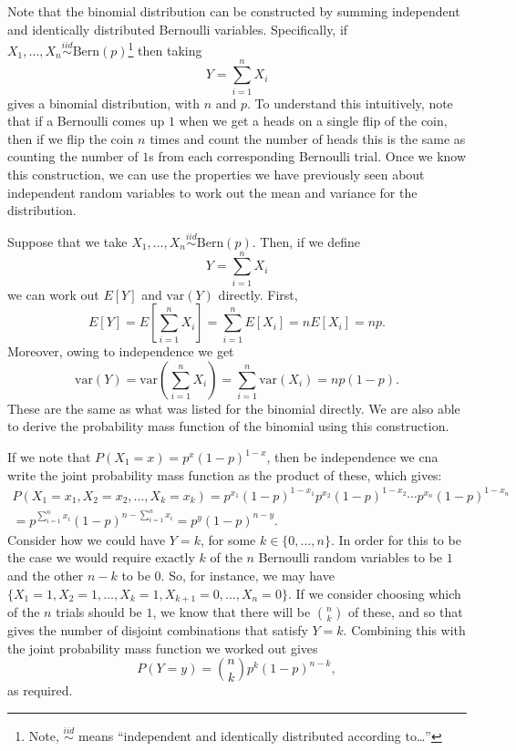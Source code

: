 \documentclass[
  letterpaper,
  DIV=11,
  numbers=noendperiod]{scrreprt}
\theoremstyle{definition}
\theoremstyle{definition}
\theoremstyle{definition}
\theoremstyle{remark}
\begin{document}
Note that the binomial distribution can be constructed by summing
independent and identically distributed Bernoulli variables.
Specifically, if
\(X_1,\dots,X_n\stackrel{iid}{\sim}\text{Bern}(p)\)\footnote{Note,
  \(\stackrel{iid}{\sim}\) means ``independent and identically
  distributed according to\ldots{}''} then taking
\[Y = \sum_{i=1}^n X_i\] gives a binomial distribution, with \(n\) and
\(p\). To understand this intuitively, note that if a Bernoulli comes up
\(1\) when we get a heads on a single flip of the coin, then if we flip
the coin \(n\) times and count the number of heads this is the same as
counting the number of \(1\)s from each corresponding Bernoulli trial.
Once we know this construction, we can use the properties we have
previously seen about independent random variables to work out the mean
and variance for the distribution.

\begin{tcolorbox}[enhanced jigsaw, coltitle=black, colframe=quarto-callout-warning-color-frame, colbacktitle=quarto-callout-warning-color!10!white, bottomrule=.15mm, opacitybacktitle=0.6, colback=white, toptitle=1mm, arc=.35mm, leftrule=.75mm, bottomtitle=1mm, opacityback=0, breakable, rightrule=.15mm, title={Construction of Binomial Random Variables}, left=2mm, titlerule=0mm, toprule=.15mm]

Suppose that we take
\(X_1,\dots,X_n \stackrel{iid}{\sim} \text{Bern}(p)\). Then, if we
define \[Y = \sum_{i=1}^n X_i\] we can work out \(E[Y]\) and
\(\text{var}(Y)\) directly. First,
\[E[Y] = E\left[\sum_{i=1}^n X_i\right] = \sum_{i=1}^n E[X_i] = nE[X_i] = np.\]
Moreover, owing to independence we get
\[\text{var}(Y) = \text{var}(\sum_{i=1}^n X_i) = \sum_{i=1}^n \text{var}(X_i) = np(1-p).\]
These are the same as what was listed for the binomial directly. We are
also able to derive the probability mass function of the binomial using
this construction.

If we note that \(P(X_1 = x) = p^{x}(1-p)^{1-x}\), then be independence
we cna write the joint probability mass function as the product of
these, which gives:
\begin{multline*}P(X_1=x_1, X_2 = x_2, \dots, X_k = x_k) = p^{x_1}(1-p)^{1-x_1}p^{x_2}(1-p)^{1-x_2}\cdots p^{x_n}(1-p)^{1-x_n} \\ = p^{\sum_{i=1}^n x_i}(1-p)^{n-\sum_{i=1}^n x_i} = p^{y}(1-p)^{n-y}.\end{multline*}
Consider how we could have \(Y = k\), for some \(k\in\{0,\dots,n\}\). In
order for this to be the case we would require exactly \(k\) of the
\(n\) Bernoulli random variables to be \(1\) and the other \(n-k\) to be
\(0\). So, for instance, we may have
\(\{X_1 = 1, X_2 = 1, \dots, X_k = 1, X_{k+1} = 0, \dots, X_n = 0\}\).
If we consider choosing which of the \(n\) trials should be \(1\), we
know that there will be \(\binom{n}{k}\) of these, and so that gives the
number of disjoint combinations that satisfy \(Y=k\). Combining this
with the joint probability mass function we worked out gives
\[P(Y=y) = \binom{n}{k}p^k(1-p)^{n-k},\] as required.

\end{tcolorbox}
\end{document}
